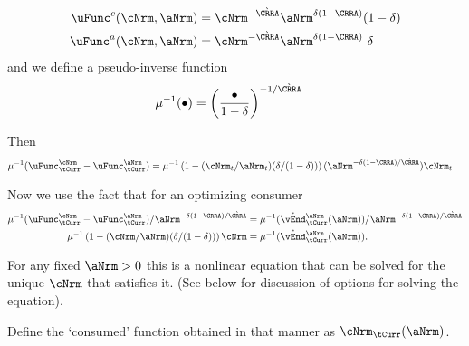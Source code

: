 \documentclass[./SolvingMicroDSOPs]{subfiles}
\begin{document}
  \begin{align}
    \uFunc^{c}(\cNrm,\aNrm) & = \cNrm^{-\grave{\CRRA}}\aNrm^{\wealthU(1-\CRRA)}(1- \wealthU)
    \\    \uFunc^{a}(\cNrm,\aNrm) & = \cNrm^{-\grave{\CRRA}}\aNrm^{\wealthU(1-\CRRA)}\phantom{~}\wealthU
  \end{align}
  and we define a pseudo-inverse function
  \begin{align}
    \muInv(\bullet) &= \left(\frac{\bullet}{1-\wealthU}\right)^{-1/\grave{\CRRA}} 
  \end{align}

  Then
  \begin{align}
    \muInv(\uFunc^{\cNrm}_{\tCurr}-\uFunc^{\aNrm}_{\tCurr}) & = \muInv\left(1-(\cNrm_{t}/\aNrm_{t})(\wealthU/(1-\wealthU))\right)(\aNrm^{-\wealthU(1-\CRRA)/\grave{\CRRA}})\cNrm_{t}
  \end{align}

  Now we use the fact that for an optimizing consumer
  \begin{align}
    \muInv(\uFunc^{\cNrm}_{\tCurr}-\uFunc^{\aNrm}_{\tCurr})/\aNrm^{-\wealthU(1-\CRRA)/\grave{\CRRA}} & = \muInv(\Maxed{\vEnd}_{\tCurr}^{\aNrm}(\aNrm))/\aNrm^{-\wealthU(1-\CRRA)/\grave{\CRRA}}
    \\ \muInv\left(1-(\cNrm/\aNrm)(\wealthU/(1-\wealthU))\right)\cNrm & = \muInv(\Maxed{\vEnd}_{\tCurr}^{\aNrm}(\aNrm)) \notag.
  \end{align}

  For any fixed $\aNrm>0$ this is a nonlinear equation that can be solved for the unique $\cNrm$ that satisfies it.  (See below for discussion of options for solving the equation).

  Define the `consumed' function obtained in that manner as $\mathfrak{\cNrm}_{\tCurr}(\aNrm)$.
\end{document}
